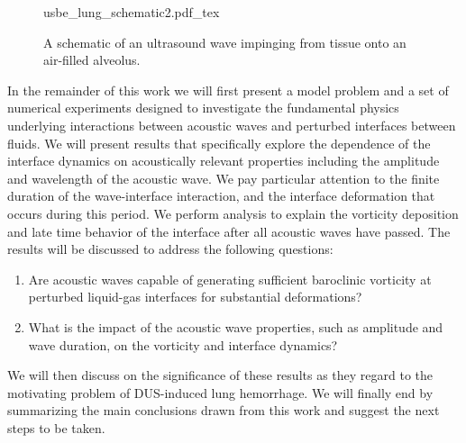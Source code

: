 \begin{figure}[h]
  \centering
  \def\svgwidth{0.48\textwidth}
  {usbe_lung_schematic2.pdf_tex} \hfill%
  \caption[A schematic view of the model problem]{A schematic of an
    ultrasound wave impinging from tissue onto an air-filled alveolus.}
  \label{fig:problem_schematic}
\end{figure}
In the remainder of this work we will first present a model problem
and a set of numerical experiments designed to investigate the
fundamental physics underlying interactions between acoustic waves and
perturbed interfaces between fluids. We will present results that
specifically explore the dependence of the interface dynamics on
acoustically relevant properties including the amplitude and
wavelength of the acoustic wave. We pay particular attention to the
finite duration of the wave-interface interaction, and the interface
deformation that occurs during this period. We perform analysis to
explain the vorticity deposition and late time behavior of the
interface after all acoustic waves have passed. The results will be
discussed to address the following questions:
\begin{enumerate} \label{itm:usbe_lung_questions}
\item Are acoustic waves capable of generating sufficient baroclinic
  vorticity at perturbed liquid-gas interfaces for substantial
  deformations?
\item What is the impact of the acoustic wave properties, such as
  amplitude and wave duration, on the vorticity and interface
  dynamics?
\end{enumerate}
We will then discuss on the significance of these results as
they regard to the motivating problem of \ac{DUS}-induced lung
hemorrhage. We will finally end by summarizing the main conclusions
drawn from this work and suggest the next steps to be taken.








